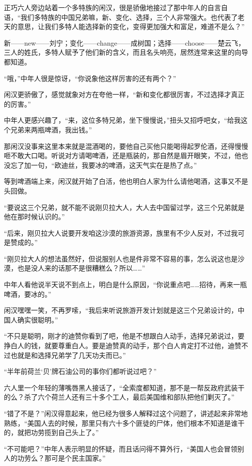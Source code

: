 正巧六人旁边站着一个多特族的闲汉，很是骄傲地接过了那中年人的自言自语，“我们多特族的中国兄弟嘛，新、变化、选择，三个人非常强大。也代表了老天的意思，让我们多特人能选择新的变化，变得更加强大和富足，难道不是么？”

新——new——刘宁；变化——change——成树国；选择——choose——楚云飞，三人的姓氏，多特人赋予了他们新的含义，而且名头响亮，居然连常来这里的向导都知道。

“哦，”中年人很是惊讶，“你说象他这样厉害的还有两个？”

闲汉更骄傲了，感觉就象对方在夸他一样，“新和变化都很厉害，不过选择才真正的厉害。”

中年人更感兴趣了，“来，这位多特兄弟，坐下慢慢说，”扭头又招呼吧女，“给我这个兄弟来两瓶啤酒，我出钱。”

那闲汉没事来这里本来就是混酒喝的，要他自己买他只能喝得起罗伦酒，还得慢慢咂不敢大口喝。听说对方请喝啤酒，还是瓶装的，那自然是眉开眼笑，不过，他也没忘了加一句，“欧迪丝，我要冰的啤酒，这天气实在是热了点。”

等到啤酒端上来，闲汉就开始了白活，他也明白人家为什么请他喝酒，这事又不是头回做。

“要说这三个兄弟，就不能不说刚贝拉大人，大人去中国留过学，这三个兄弟就是他在那时候认识的。”

“后来，刚贝拉大人说要开发咱这沙漠的旅游资源，族里有不少人反对，不过我可是赞成的。”

“刚贝拉大人的想法虽然好，但说服别人也是件非常不容易的事，怎么说这也是沙漠，也是没人来的话那不是很糟糕么？所以……”

中年人看他说半天说不到点上，明白是什么原因，“你说重点吧……招待，再来一瓶啤酒，要冰的。”

闲汉嘿嘿一笑，不再罗嗦，“我后来听说旅游开发计划就是这三个兄弟设计的，中国人确实很聪明。”

“不只是聪明，刚才的迪赞你看到了吧，他是不想跟白人动手，选择兄弟说过，要挣白人的钱，就要尊重白人。要是迪赞真的动手，那个白人肯定打不过他，迪赞不过也就是和选择兄弟学了几天功夫而已。”

“半年前荷兰‘贝’牌石油公司的事你们都听说过吧？”

六人里一个年轻的薄嘴唇黑人接话了，“全索度都知道，那不是一帮反政府武装干的么？杀了六个荷兰人还有三十多个工人，最后美国维和部队把他们剿灭了。”

“错了不是？”闲汉得意起来，他已经为很多人解释过这个问题了，讲述起来非常地熟练，“美国人去的时候，那里只有六十多个匪徒的尸体，他们根本不知道是谁干的，就把功劳揽到自己头上了。”

“不可能吧？”中年人表示明显的怀疑，而且话问得不算外行，“美国人也会冒领别人的功劳么？那可是个民主国家。”

